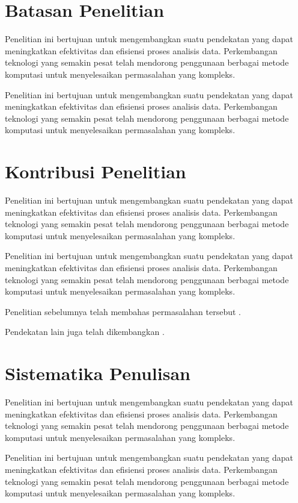 \section{Batasan Penelitian}
Penelitian ini bertujuan untuk mengembangkan suatu pendekatan yang dapat meningkatkan efektivitas dan efisiensi proses analisis data. Perkembangan teknologi yang semakin pesat telah mendorong penggunaan berbagai metode komputasi untuk menyelesaikan permasalahan yang kompleks.

Penelitian ini bertujuan untuk mengembangkan suatu pendekatan yang dapat meningkatkan efektivitas dan efisiensi proses analisis data. Perkembangan teknologi yang semakin pesat telah mendorong penggunaan berbagai metode komputasi untuk menyelesaikan permasalahan yang kompleks.

\section{Kontribusi Penelitian}
Penelitian ini bertujuan untuk mengembangkan suatu pendekatan yang dapat meningkatkan efektivitas dan efisiensi proses analisis data. Perkembangan teknologi yang semakin pesat telah mendorong penggunaan berbagai metode komputasi untuk menyelesaikan permasalahan yang kompleks.

Penelitian ini bertujuan untuk mengembangkan suatu pendekatan yang dapat meningkatkan efektivitas dan efisiensi proses analisis data. Perkembangan teknologi yang semakin pesat telah mendorong penggunaan berbagai metode komputasi untuk menyelesaikan permasalahan yang kompleks.

Penelitian sebelumnya telah membahas permasalahan tersebut
\parencite{neuman1980}.

Pendekatan lain juga telah dikembangkan
\parencite{siregar2006}.

\section{Sistematika Penulisan}
Penelitian ini bertujuan untuk mengembangkan suatu pendekatan yang dapat meningkatkan efektivitas dan efisiensi proses analisis data. Perkembangan teknologi yang semakin pesat telah mendorong penggunaan berbagai metode komputasi untuk menyelesaikan permasalahan yang kompleks.

Penelitian ini bertujuan untuk mengembangkan suatu pendekatan yang dapat meningkatkan efektivitas dan efisiensi proses analisis data. Perkembangan teknologi yang semakin pesat telah mendorong penggunaan berbagai metode komputasi untuk menyelesaikan permasalahan yang kompleks.

